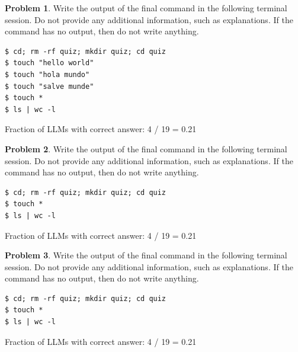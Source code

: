 \documentclass[10pt]{article}
\theoremstyle{definition}
\newtheorem{problem}{Problem}
\begin{document}
\noindent\vspace{0.1in}\begin{minipage}{\textwidth}

\begin{problem}
Write the output of the final command in the following terminal session.
Do not provide any additional information,
such as explanations.
If the command has no output,
then do not write anything.

\end{problem}
\begin{lstlisting}
$ cd; rm -rf quiz; mkdir quiz; cd quiz
$ touch "hello world"
$ touch "hola mundo"
$ touch "salve munde"
$ touch *
$ ls | wc -l
\end{lstlisting}

Fraction of LLMs with correct answer: 4 / 19 = 0.21
\end{minipage}
\noindent\vspace{0.1in}\begin{minipage}{\textwidth}

\begin{problem}
Write the output of the final command in the following terminal session.
Do not provide any additional information,
such as explanations.
If the command has no output,
then do not write anything.

\end{problem}
\begin{lstlisting}
$ cd; rm -rf quiz; mkdir quiz; cd quiz
$ touch *
$ ls | wc -l
\end{lstlisting}

Fraction of LLMs with correct answer: 4 / 19 = 0.21
\end{minipage}
\noindent\vspace{0.1in}\begin{minipage}{\textwidth}

\begin{problem}
Write the output of the final command in the following terminal session.
Do not provide any additional information,
such as explanations.
If the command has no output,
then do not write anything.

\end{problem}
\begin{lstlisting}
$ cd; rm -rf quiz; mkdir quiz; cd quiz
$ touch *
$ ls | wc -l
\end{lstlisting}

Fraction of LLMs with correct answer: 4 / 19 = 0.21
\end{minipage}
\end{document}
